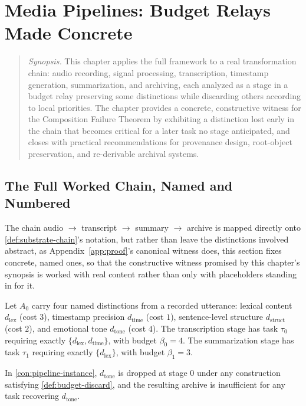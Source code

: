 \chapter{Media Pipelines: Budget Relays Made Concrete}
\label{ch:pipelines}

\begin{quotation}
\noindent\textit{Synopsis.} This chapter applies the full framework to a
real transformation chain: audio recording, signal processing,
transcription, timestamp generation, summarization, and archiving, each
analyzed as a stage in a budget relay preserving some distinctions while
discarding others according to local priorities. The chapter provides a
concrete, constructive witness for the Composition Failure Theorem by
exhibiting a distinction lost early in the chain that becomes critical for
a later task no stage anticipated, and closes with practical
recommendations for provenance design, root-object preservation, and
re-derivable archival systems.
\end{quotation}

\section{The Full Worked Chain, Named and Numbered}

The chain audio $\to$ transcript $\to$ summary $\to$ archive is mapped
directly onto \cref{def:substrate-chain}'s notation, but rather than
leave the distinctions involved abstract, as
Appendix~\ref{app:proof}'s canonical witness does, this section fixes
concrete, named ones, so that the constructive witness promised by this
chapter's synopsis is worked with real content rather than only with
placeholders standing in for it.

\begin{construction}
\label{con:pipeline-instance}
Let $A_0$ carry four named distinctions from a recorded utterance:
lexical content $d_{\mathrm{lex}}$ (cost $3$), timestamp precision
$d_{\mathrm{time}}$ (cost $1$), sentence-level structure
$d_{\mathrm{struct}}$ (cost $2$), and emotional tone $d_{\mathrm{tone}}$
(cost $4$). The transcription stage has task $\tau_0$ requiring exactly
$\{d_{\mathrm{lex}}, d_{\mathrm{time}}\}$, with budget $\beta_0 = 4$. The
summarization stage has task $\tau_1$ requiring exactly
$\{d_{\mathrm{lex}}\}$, with budget $\beta_1 = 3$.
\end{construction}

\begin{proposition}
\label{prop:named-instance-failure}
In \cref{con:pipeline-instance}, $d_{\mathrm{tone}}$ is dropped at stage
$0$ under any construction satisfying \cref{def:budget-discard}, and the
resulting archive is insufficient for any task recovering
$d_{\mathrm{tone}}$.
\end{proposition}

